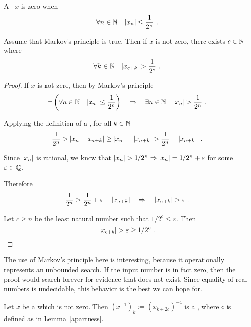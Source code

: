 \documentclass[leqno]{report}
\begin{document}
\begin{Definition}[Zero]
    A \FCCS \ $x$ is zero when
    \[ \forall {n \in \mathbb{N}} \quad {\left| x_n \right| \leq \frac{1}{2^n}} \ . \]
\end{Definition}

\begin{Lemma}[Apartness] \label{apartness}
    Assume that Markov's principle is true. Then if $x$ is not zero, there exists $c \in \mathbb{N}$ where
    \[ \forall {k \in \mathbb{N}} \quad {\left| x_{c+k} \right| > \frac{1}{2^c}} \ . \]
\end{Lemma}

\begin{proof}
    If $x$ is not zero, then by Markov's principle
    \[
        \neg \left( \forall {n \in \mathbb{N}} \quad {\left| x_n \right| \leq \frac{1}{2^n}} \right)
        \quad \Rightarrow \quad
        \exists {n \in \mathbb{N}} \quad {\left| x_n \right| > \frac{1}{2^n}} \ .
    \]

    Applying the definition of a \FCCS, for all $k \in \mathbb{N}$
    \begin{align*}
        \frac{1}{2^n}
        > \left| x_n - x_{n+k} \right|
        \geq \left| x_n \right| - \left| x_{n+k} \right|
        > \frac{1}{2^n} - \left| x_{n+k} \right| \ .
    \end{align*}

    Since $\left| x_n \right|$ is rational, we know that
    $\left| x_n \right| > 1/2^n \Rightarrow \left| x_n \right| = 1/2^n + \varepsilon$
    for some $\varepsilon \in \mathbb{Q}$.

    Therefore
    \[
        \frac{1}{2^n} > \frac{1}{2^n} + \varepsilon - \left| x_{n+k} \right|
        \quad \Rightarrow \quad
        \left| x_{n+k} \right| > \varepsilon \ .
    \]

    Let $c \geq n$ be the least natural number such that $1/2^c \leq \varepsilon$. Then
    \[ \left| x_{c+k} \right| > \varepsilon \geq 1/2^c \ . \qedhere \]
\end{proof}

The use of Markov's principle here is interesting, because it operationally represents an unbounded search. If the input number is in fact zero, then the proof would search forever for evidence that does not exist. Since equality of real numbers is undecidable, this behavior is the best we can hope for.

\begin{Proposition}[Reciprocal]
    Let $x$ be a \FCCS{} which is not zero. Then $\left(x^{-1}\right)_k := \left(x_{k+2c}\right)^{-1}$ is a \FCCS, where $c$ is defined as in Lemma~\ref{apartness}.
\end{Proposition}
\end{document}
